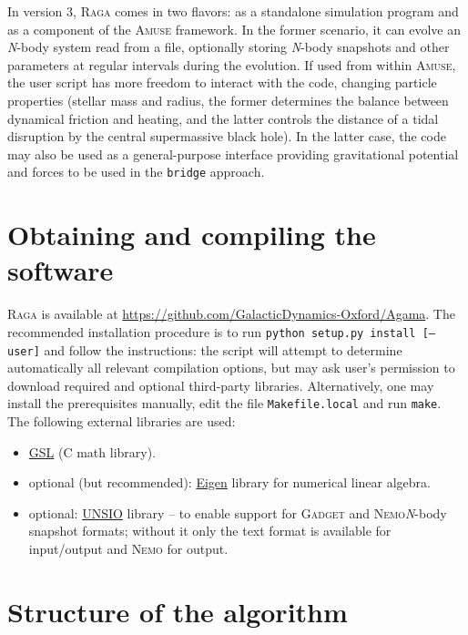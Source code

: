 \documentclass[12pt]{article}
\newcommand{\Nbody}{\textsl{N}-body\xspace}
\newcommand{\Raga}{\textsc{Raga}\xspace}
\newcommand{\Amuse}{\textsc{Amuse}\xspace}
\newcommand{\Nemo}{\textsc{Nemo}\xspace}
\begin{document}
In version 3, \Raga comes in two flavors: as a standalone simulation program and as a component of the \Amuse framework. In the former scenario, it can evolve an \Nbody system read from a file, optionally storing \Nbody snapshots and other parameters at regular intervals during the evolution. If used from within \Amuse, the user script has more freedom to interact with the code, changing particle properties (stellar mass and radius, the former determines the balance between dynamical friction and heating, and the latter controls the distance of a tidal disruption by the central supermassive black hole). In the latter case, the code may also be used as a general-purpose interface providing gravitational potential and forces to be used in the \texttt{bridge} approach.


\section{Obtaining and compiling the software}

\Raga is available at \url{https://github.com/GalacticDynamics-Oxford/Agama}. The recommended installation procedure is to run \texttt{python setup.py install [--user]} and follow the instructions: the script will attempt to determine automatically all relevant compilation options, but may ask user's permission to download required and optional third-party libraries. Alternatively, one may install the prerequisites manually, edit the file \texttt{Makefile.local} and run \texttt{make}. The following external libraries are used:
\begin{itemize}
\item \href{http://www.gnu.org/software/gsl/}{GSL} (C math library).
\item optional (but recommended): \href{http://eigen.tuxfamily.org/}{Eigen} library for numerical linear algebra.
\item optional: \href{http://projets.lam.fr/projects/unsio/}{UNSIO} library -- to enable support for \textsc{Gadget} and \Nemo \Nbody snapshot formats; without it only the text format is available for input/output and \Nemo for output.
\end{itemize}

\section{Structure of the algorithm}  \label{sec:algorithm}
\end{document}
